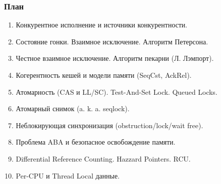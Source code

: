 \begin{frame}
\frametitle{План}

\begin{enumerate}
  \item Конкурентное исполнение и источники конкурентности.
  \item Состояние гонки. Взаимное исключение. Алгоритм Петерсона.
  \item Честное взаимное исключение. Алгоритм пекарни (Л. Лэмпорт).
  \item Когерентность кешей и модели памяти (SeqCst, AckRel).
  \item Атомарность (CAS и LL/SC). Test-And-Set Lock. Queued Locks.
  \item Атомарный снимок (a. k. a. seqlock).
  \item Неблокирующая синхронизация (obstruction/lock/wait free).
  \item Проблема ABA и безопасное освобождение памяти.
  \item Differential Reference Counting. Hazzard Pointers. RCU.
  \item Per-CPU и Thread Local данные.
\end{enumerate}
\end{frame}
